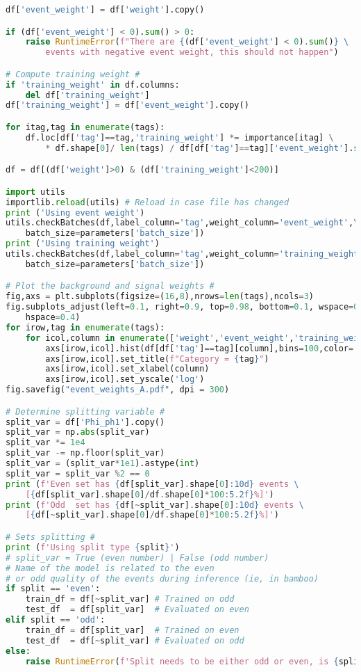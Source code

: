 \begin{lstlisting}[language=Python, caption=Python module of the analysis used in Bamboo framework, label={dnncode}]
df['event_weight'] = df['weight'].copy()

if (df['event_weight'] < 0).sum() > 0:
    raise RuntimeError(f"There are {(df['event_weight'] < 0).sum()} \
        events with negative event weight, this should not happen")

# Compute training weight #
if 'training_weight' in df.columns:
    del df['training_weight']
df['training_weight'] = df['event_weight'].copy()

for itag,tag in enumerate(tags):
    df.loc[df['tag']==tag,'training_weight'] *= importance[itag] \
        * df.shape[0]/ len(tags) / df[df['tag']==tag]['event_weight'].sum()

df = df[(df['weight']>0) & (df['training_weight']<200)]

import utils
importlib.reload(utils) # Reload in case file has changed
print ('Using event weight')
utils.checkBatches(df,label_column='tag',weight_column='event_weight',\
    batch_size=parameters['batch_size'])
print ('Using training weight')
utils.checkBatches(df,label_column='tag',weight_column='training_weight',\
    batch_size=parameters['batch_size'])

# Plot the background and signal weights #
fig,axs = plt.subplots(figsize=(16,8),nrows=len(tags),ncols=3)
fig.subplots_adjust(left=0.1, right=0.9, top=0.98, bottom=0.1, wspace=0.2,\
    hspace=0.4)
for irow,tag in enumerate(tags):
    for icol,column in enumerate(['weight','event_weight','training_weight']):
        axs[irow,icol].hist(df[df['tag']==tag][column],bins=100,color='b')
        axs[irow,icol].set_title(f"Category = {tag}")
        axs[irow,icol].set_xlabel(column)
        axs[irow,icol].set_yscale('log')
fig.savefig("event_weights_A.pdf", dpi = 300)

# Determine splitting variable #
split_var = df['Phi_ph1'].copy()
split_var = np.abs(split_var)
split_var *= 1e4
split_var -= np.floor(split_var) 
split_var = (split_var*1e1).astype(int)
split_var = split_var %2 == 0
print (f'Even set has {df[split_var].shape[0]:10d} events \
    [{df[split_var].shape[0]/df.shape[0]*100:5.2f}%]')
print (f'Odd  set has {df[~split_var].shape[0]:10d} events \
    [{df[~split_var].shape[0]/df.shape[0]*100:5.2f}%]')

# Sets splitting #
print (f'Using split type {split}')
# split_var = True (even number) | False (odd number)
# Name of the model is related to the even 
# or odd quality of the events during inference (ie, in bamboo)
if split == 'even':
    train_df = df[~split_var] # Trained on odd
    test_df  = df[split_var]  # Evaluated on even 
elif split == 'odd':
    train_df = df[split_var]  # Trained on even
    test_df  = df[~split_var] # Evaluated on odd 
else:
    raise RuntimeError(f'Split needs to be either odd or even, is {split}')


\end{lstlisting}
